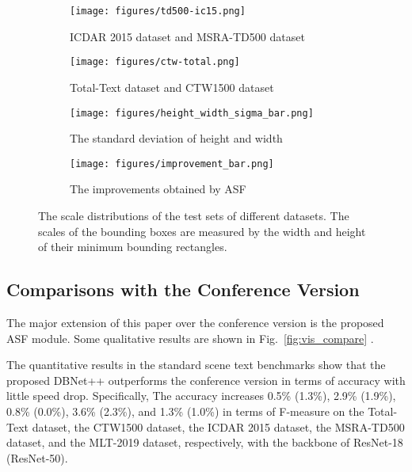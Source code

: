 \begin{figure*}[htbp]
\centering
    \begin{subfigure}{0.21\linewidth}
    \centering
        \texttt{[image: figures/td500-ic15.png]}
        \caption{ICDAR 2015 dataset and MSRA-TD500 dataset}
    \end{subfigure} \qquad
    \begin{subfigure}{0.21\linewidth}
    \centering
        \texttt{[image: figures/ctw-total.png]}
        \caption{Total-Text dataset and CTW1500 dataset}
   \end{subfigure} \qquad
    \begin{subfigure}{0.21\linewidth}
    \centering
        \texttt{[image: figures/height\_width\_sigma\_bar.png]}
        \caption{The standard deviation of height and width}
   \end{subfigure} \qquad
   \begin{subfigure}{0.21\linewidth}
    \centering
        \texttt{[image: figures/improvement\_bar.png]}
        \caption{The improvements obtained by ASF}
   \end{subfigure}
\caption{The scale distributions of the test sets of different datasets.  The scales of the bounding boxes are measured by the width and height of their minimum bounding rectangles.}
\label{fig:dataset_scale}
\end{figure*}

\subsection{Comparisons with the Conference Version}
The major extension of this paper over the conference version is the proposed ASF module. Some qualitative results are shown in Fig.~\ref{fig:vis_compare} . 


The quantitative results in the standard scene text benchmarks show that the proposed DBNet++ outperforms the conference version in terms of accuracy with little speed drop. Specifically, The accuracy increases 0.5\% (1.3\%), 2.9\% (1.9\%), 0.8\% (0.0\%), 3.6\% (2.3\%), and 1.3\% (1.0\%) in terms of F-measure on the Total-Text dataset, the CTW1500 dataset, the ICDAR 2015 dataset, the MSRA-TD500 dataset, and the MLT-2019 dataset, respectively, with the backbone of ResNet-18 (ResNet-50).

